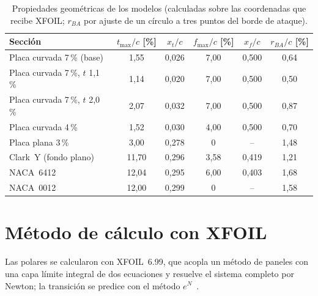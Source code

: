 \begin{table}[H]
\centering\small
\caption{Propiedades geométricas de los modelos (calculadas sobre las coordenadas que
recibe XFOIL; $r_{BA}$ por ajuste de un círculo a tres puntos del borde de ataque).}
\label{tab:polares-geom}
\begin{tabular}{@{}lccccc@{}}
\toprule
\textbf{Sección} & $t_{\max}/c$ [\%] & $x_t/c$ & $f_{\max}/c$ [\%] & $x_f/c$ & $r_{BA}/c$ [\%]\\\midrule
Placa curvada 7\,\% (base)  & 1,55  & 0,026 & 7,00 & 0,500 & 0,64\\
Placa curvada 7\,\%, $t$ 1,1\,\% & 1,14 & 0,020 & 7,00 & 0,500 & 0,50\\
Placa curvada 7\,\%, $t$ 2,0\,\% & 2,07 & 0,032 & 7,00 & 0,500 & 0,87\\
Placa curvada 4\,\%         & 1,52  & 0,030 & 4,00 & 0,500 & 0,70\\
Placa plana 3\,\%           & 3,00  & 0,278 & 0    & --    & 1,48\\
Clark~Y (fondo plano)       & 11,70 & 0,296 & 3,58 & 0,419 & 1,21\\
NACA~6412                   & 12,04 & 0,295 & 6,00 & 0,403 & 1,68\\
NACA~0012                   & 12,00 & 0,299 & 0    & --    & 1,58\\
\bottomrule
\end{tabular}
\end{table}

\section{Método de cálculo con XFOIL}\label{sec:polares-metodo}

Las polares se calcularon con XFOIL~6.99, que acopla un método de paneles con una capa
límite integral de dos ecuaciones y resuelve el sistema completo por Newton; la
transición se predice con el método $e^N$~\cite{polares-drela1987,polares-drela1989,polares-vaningen2008}.

